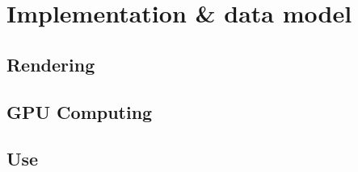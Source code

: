 \section{Implementation \& data model}
\label{sec:implementation}
\subsection{Rendering}
\subsection{GPU Computing}
\subsection{Use}
